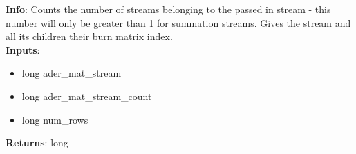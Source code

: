 \textbf{Info}: Counts the number of streams belonging to the passed in stream -
this number will only be greater than 1 for summation streams. Gives the
stream and all its children their burn matrix index.\\

\noindent \textbf{Inputs}:
\begin{itemize}
\item{long ader\_mat\_stream}
\item{long ader\_mat\_stream\_count}
\item{long num\_rows}
\end{itemize}

\noindent \textbf{Returns}: long
